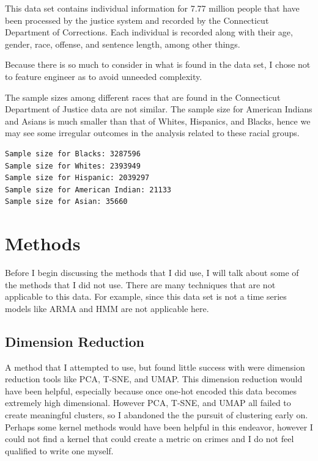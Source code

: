 \documentclass[11pt]{article}
\begin{document}
This data set contains individual information for 7.77 million people
that have been processed by the justice system and recorded by the
Connecticut Department of Corrections. Each individual is recorded along
with their age, gender, race, offense, and sentence length, among other
things.

Because there is so much to consider in what is found in the data set, I
chose not to feature engineer as to avoid unneeded complexity.

The sample sizes among different races that are found in the Connecticut
Department of Justice data are not similar. The sample size for American
Indians and Asians is much smaller than that of Whites, Hispanics, and
Blacks, hence we may see some irregular outcomes in the analysis related
to these racial groups.

    \begin{Verbatim}[commandchars=\\\{\}]
Sample size for Blacks: 3287596
Sample size for Whites: 2393949
Sample size for Hispanic: 2039297
Sample size for American Indian: 21133
Sample size for Asian: 35660

    \end{Verbatim}

    \hypertarget{methods}{%
\section{Methods}\label{methods}}

Before I begin discussing the methods that I did use, I will talk about
some of the methods that I did not use. There are many techniques that
are not applicable to this data. For example, since this data set is not
a time series models like ARMA and HMM are not applicable here.

\hypertarget{dimension-reduction}{%
\subsection{Dimension Reduction}\label{dimension-reduction}}

A method that I attempted to use, but found little success with were
dimension reduction tools like PCA, T-SNE, and UMAP. This dimension
reduction would have been helpful, especially because once one-hot
encoded this data becomes extremely high dimensional. However PCA,
T-SNE, and UMAP all failed to create meaningful clusters, so I abandoned
the the pursuit of clustering early on. Perhaps some kernel methods
would have been helpful in this endeavor, however I could not find a
kernel that could create a metric on crimes and I do not feel qualified
to write one myself.
\end{document}
